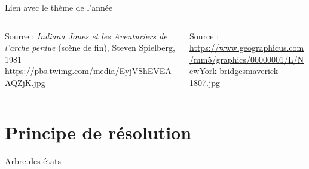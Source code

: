     \begin{frame}{Lien avec le thème de l'année}
        \centering
        \begin{columns}
            \begin{column}{0.5\textwidth}
                {Source : \textit{Indiana Jones et les Aventuriers de l'arche perdue} (scène de fin), Steven Spielberg, 1981
                    \url{https://pbs.twimg.com/media/EyjVShEVEAAQZjK.jpg}}%
            \end{column}
            \begin{column}{0.5\textwidth}
                {Source : \url{https://www.geographicus.com/mm5/graphics/00000001/L/NewYork-bridgesmaverick-1807.jpg}}%
            \end{column}
        \end{columns}
    \end{frame}

    \section{Principe de résolution}
        \begin{frame}{Arbre des états}
            
        \end{frame}

